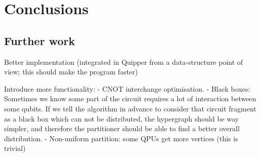 \chapter{Conclusions}

\section{Further work}


Better implementation (integrated in Quipper from a data-structure point of view; this should make the program faster)

Introduce more functionality:
  - CNOT interchange optimisation.
  - Black boxes: Sometimes we know some part of the circuit requires a lot of interaction between some qubits. If we tell the algorithm in advance to consider that circuit fragment as a black box which can not be distributed, the hypergraph should be way simpler, and therefore the partitioner should be able to find a better overall distribution.
  - Non-uniform partition: some QPUs get more vertices (this is trivial)
